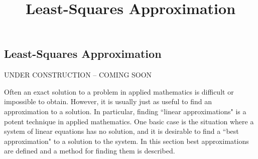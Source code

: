 \documentclass{ximera}
\title{Least-Squares Approximation} \license{CC BY-NC-SA 4.0}
\begin{document}
\begin{abstract}
\end{abstract}
\maketitle

\begin{onlineOnly}
\section*{Least-Squares Approximation}
\end{onlineOnly}

\begin{center}
 
UNDER CONSTRUCTION -- COMING SOON
\end{center}

Often an exact solution to a problem in applied mathematics is difficult or impossible to obtain. However, it is usually just as useful to find an approximation to a solution. In particular, finding ``linear approximations" is a potent technique in applied mathematics. One basic case is the situation where a system
of linear equations has no solution, and it is desirable to find a ``best approximation" to a solution to the
system. In this section best approximations are defined and a method for finding them is described. 
\end{document}
